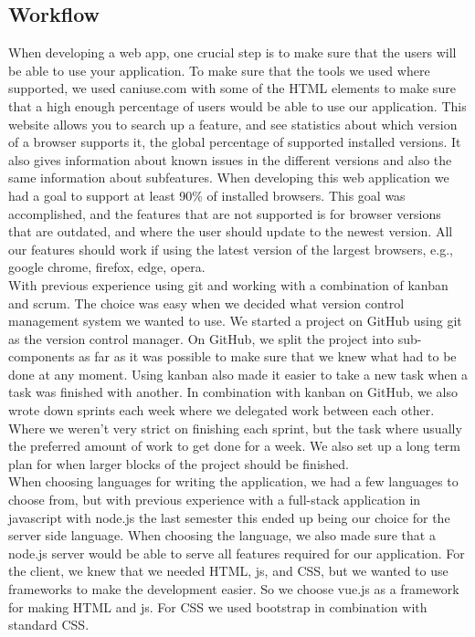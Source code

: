 \subsection{Workflow}
When developing a web app, one crucial step is to make sure that the users will be able to use your application. To make sure that the tools we used where supported, we used caniuse.com with some of the HTML elements to make sure that a high enough percentage of users would be able to use our application. This website allows you to search up a feature, and see statistics about which version of a browser supports it, the global percentage of supported installed versions. It also gives information about known issues in the different versions and also the same information about subfeatures. When developing this web application we had a goal to support at least 90\% of installed browsers. This goal was accomplished, and the features that are not supported is for browser versions that are outdated, and where the user should update to the newest version. All our features should work if using the latest version of the largest browsers, e.g., google chrome, firefox, edge, opera.
\\[11pt]
With previous experience using git and working with a combination of kanban and scrum. The choice was easy when we decided what version control management system we wanted to use. We started a project on GitHub using git as the version control manager. On GitHub, we split the project into sub-components as far as it was possible to make sure that we knew what had to be done at any moment. Using kanban also made it easier to take a new task when a task was finished with another. In combination with kanban on GitHub, we also wrote down sprints each week where we delegated work between each other. Where we weren't very strict on finishing each sprint, but the task where usually the preferred amount of work to get done for a week. We also set up a long term plan for when larger blocks of the project should be finished.
\\[11pt]
When choosing languages for writing the application, we had a few languages to choose from, but with previous experience with a full-stack application in javascript with node.js the last semester this ended up being our choice for the server side language. When choosing the language, we also made sure that a node.js server would be able to serve all features required for our application. For the client, we knew that we needed HTML, js, and CSS, but we wanted to use frameworks to make the development easier. So we choose vue.js as a framework for making HTML and js. For CSS we used bootstrap in combination with standard CSS.